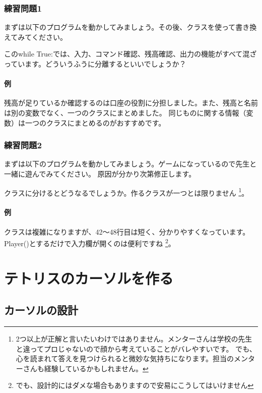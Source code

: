 \documentclass[12pt, a4paper, dvipdfmx]{book}
\begin{document}
\subsection{練習問題1}
まずは以下のプログラムを動かしてみましょう。その後、クラスを使って書き換えてみてください。

このwhile True:では、入力、コマンド確認、残高確認、出力の機能がすべて混ざっています。どういうふうに分離するといいでしょうか？
\newpage
\subsubsection{例}

残高が足りているか確認するのは口座の役割に分担しました。また、残高と名前は別の変数でなく、一つのクラスにまとめました。
同じものに関する情報（変数）は一つのクラスにまとめるのがおすすめです。

\subsection{練習問題2}
まずは以下のプログラムを動かしてみましょう。ゲームになっているので先生と一緒に遊んでみてください。
原因が分かり次第修正します。

クラスに分けるとどうなるでしょうか。作るクラスが一つとは限りません
\footnote{2つ以上が正解と言いたいわけではありません。メンターさんは学校の先生と違ってプロじゃないので顔から考えていることがバレやすいです。
  でも、心を読まれて答えを見つけられると微妙な気持ちになります。担当のメンターさんも経験しているかもしれません。}。

\newpage
\subsubsection{例}

クラスは複雑になりますが、42〜48行目は短く、分かりやすくなっています。Player()とするだけで入力欄が開くのは便利ですね
\footnote{でも、設計的にはダメな場合もありますので安易にこうしてはいけません}。

\chapter{テトリスのカーソルを作る}
\section{カーソルの設計}
\end{document}
